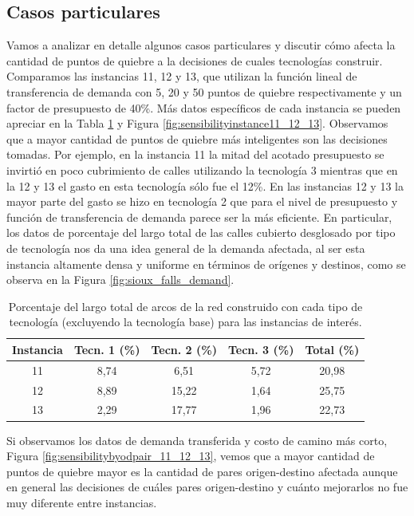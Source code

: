\FloatBarrier
\subsection*{Casos particulares}

Vamos a analizar en detalle algunos casos particulares y discutir cómo afecta la cantidad de puntos de quiebre a la decisiones de cuales tecnologías construir. Comparamos las instancias 11, 12 y 13, que utilizan la función lineal de transferencia de demanda con 5, 20 y 50 puntos de quiebre respectivamente y un factor de presupuesto de 40\%. Más datos específicos de cada instancia se pueden apreciar en la Tabla \ref{table:sensibilityinfralengths} y Figura \ref{fig:sensibilityinstance11_12_13}. Observamos que a mayor cantidad de puntos de quiebre más inteligentes son las decisiones tomadas. Por ejemplo, en la instancia 11 la mitad del acotado presupuesto se invirtió en poco cubrimiento de calles utilizando la tecnología 3 mientras que en la 12 y 13 el gasto en esta tecnología sólo fue el 12\%. En las instancias 12 y 13 la mayor parte del gasto se hizo en tecnología 2 que para el nivel de presupuesto y función de transferencia de demanda parece ser la más eficiente. En particular, los datos de porcentaje del largo total de las calles cubierto desglosado por tipo de tecnología nos da una idea general de la demanda afectada, al ser esta instancia altamente densa y uniforme en términos de orígenes y destinos, como se observa en la Figura \ref{fig:sioux_falls_demand}.

 \begin{table}[h!]
  \centering
  \begin{tabular}{ccccc}
    \toprule
      Instancia & Tecn. 1 (\%) & Tecn. 2 (\%) & Tecn. 3 (\%) & Total (\%) \\
    \midrule
      11 & 8,74  & 6,51   & 5,72 & 20,98 \\
      12 & 8,89  & 15,22  & 1,64 & 25,75 \\
      13 & 2,29  & 17,77  & 1,96 & 22,73 \\
    \bottomrule
  \end{tabular}
  \caption{Porcentaje del largo total de arcos de la red construido con cada tipo de tecnología (excluyendo la tecnología base) para las instancias de interés.}\label{table:sensibilityinfralengths}
\end{table}

Si observamos los datos de demanda transferida y costo de camino más corto, Figura \ref{fig:sensibilitybyodpair_11_12_13}, vemos que a mayor cantidad de puntos de quiebre mayor es la cantidad de pares origen-destino afectada aunque en general las decisiones de cuáles pares origen-destino y cuánto mejorarlos no fue muy diferente entre instancias.

